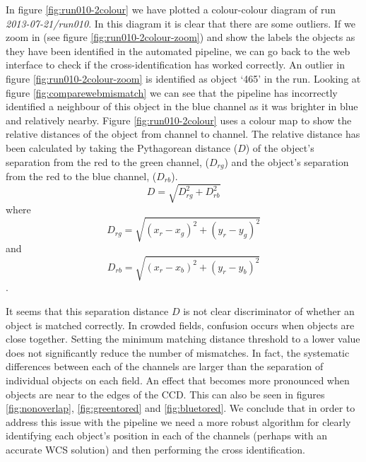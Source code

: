 In figure \ref{fig:run010-2colour} we have plotted a colour-colour diagram of run \emph{2013-07-21/run010}. In this diagram it is clear that there are some outliers. If we zoom in (see figure \ref{fig:run010-2colour-zoom}) and show the labels the objects as they have been identified in the automated pipeline, we can go back to the web interface to check if the cross-identification has worked correctly. An outlier in figure \ref{fig:run010-2colour-zoom} is identified as object `465' in the run. Looking at figure \ref{fig:comparewebmismatch} we can see that the pipeline has incorrectly identified a neighbour of this object in the blue channel as it was brighter in blue and relatively nearby. Figure \ref{fig:run010-2colour} uses a colour map to show the relative distances of the object from channel to channel. The relative distance has been calculated by taking the Pythagorean distance ($D$) of the object's separation from the red to the green channel, ($D_{rg}$) and the object's separation from the red to the blue channel, ($D_{rb}$).  \begin{equation}D = \sqrt{ D_{rg}^2 + D_{rb}^2}\end{equation}where \begin{equation}D_{rg} = \sqrt{ (x_r - x_g)^2 + (y_r - y_g)^2}\end{equation} and \begin{equation}D_{rb} = \sqrt{ (x_r - x_b)^2 + (y_r - y_b)^2} \end{equation}.

It seems that this separation distance $D$ is not clear discriminator of whether an object is matched correctly. In crowded fields, confusion occurs when objects are close together. Setting the minimum matching distance threshold to a lower value does not significantly reduce the number of mismatches. In fact, the systematic differences between each of the channels are larger than the separation of individual objects on each field. An effect that becomes more pronounced when objects are near to the edges of the CCD. This can also be seen in figures  \ref{fig:nonoverlap}, \ref{fig:greentored} and \ref{fig:bluetored}.  We conclude that in order to address this issue with the pipeline we need a more robust algorithm for clearly identifying each object's position in each of the channels (perhaps with an accurate WCS solution) and then performing the cross identification. 

